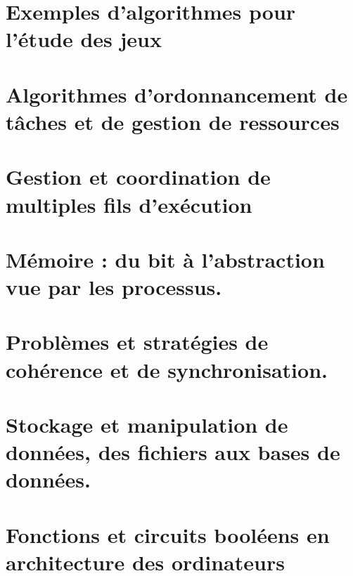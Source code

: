 \chapter{Exemples d'algorithmes pour l'étude des jeux} \label{L16}


\chapter{Algorithmes d'ordonnancement de tâches et de gestion de ressources} \label{L17}


\chapter{Gestion et coordination de multiples fils d'exécution} \label{L18}


\chapter{Mémoire : du bit à l’abstraction vue par les processus.} \label{L19}

\chapter{Problèmes et stratégies de cohérence et de synchronisation.} \label{L20}


\chapter{Stockage et manipulation de données, des fichiers aux bases de données.} \label{L21}


\chapter{Fonctions et circuits booléens en architecture des ordinateurs} \label{L22}

%
 


